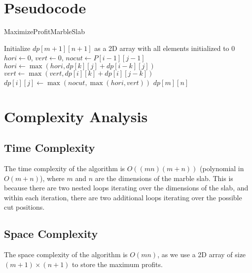 \documentclass{article}
\begin{document}
\section{Pseudocode}
    \begin{algorithm}
    \caption{MaximizeProfitMarbleSlab}
    \begin{algorithmic}[1]
    
     
        \State Initialize $dp[m+1][n+1]$ as a 2D array with all elements initialized to $0$
          
              
                \State $hori \gets 0$, $vert \gets 0$, $nocut \gets P[i-1][j-1]$  
                  
                    \State $hori \gets \max(hori, dp[k][j] + dp[i-k][j])$  
                \EndFor
                  
                    \State $vert \gets \max(vert, dp[i][k] + dp[i][j-k])$  
                \EndFor
                \State $dp[i][j] \gets \max(nocut, \max(hori, vert))$  
            \EndFor
        \EndFor
        \State \Return $dp[m][n]$  
    \EndFunction

\end{algorithmic}
\end{algorithm}


\section{Complexity Analysis}
    \subsection{Time Complexity}
    The time complexity of the algorithm is $O((mn)(m + n))$ (polynomial in $O(m+n)$), where $m$ and $n$ are the dimensions of the marble slab. This is because there are two nested loops iterating over the dimensions of the slab, and within each iteration, there are two additional loops iterating over the possible cut positions.
    
    \subsection{Space Complexity}
    The space complexity of the algorithm is $O(mn)$, as we use a 2D array of size $(m+1) \times (n+1)$ to store the maximum profits.
\end{document}
